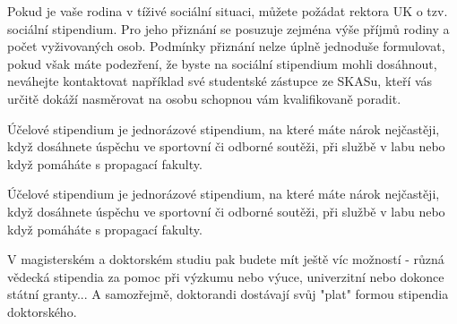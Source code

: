 Pokud je vaše rodina v tíživé sociální situaci, můžete požádat rektora UK o tzv.
sociální stipendium. Pro jeho přiznání se posuzuje zejména výše příjmů rodiny a
počet vyživovaných osob. Podmínky přiznání nelze úplně jednoduše formulovat,
pokud však máte podezření, že byste na sociální stipendium mohli dosáhnout,
neváhejte kontaktovat například své studentské zástupce ze SKASu, kteří vás
určitě dokáží nasměrovat na osobu schopnou vám kvalifikovaně poradit.

Účelové stipendium je jednorázové stipendium, na které máte nárok nejčastěji,
když dosáhnete úspěchu ve sportovní či odborné soutěži, při službě v labu nebo
když pomáháte s propagací fakulty.

Účelové stipendium je jednorázové stipendium, na které máte nárok nejčastěji,
když dosáhnete úspěchu ve sportovní či odborné soutěži, při službě v labu nebo
když pomáháte s propagací fakulty.

V magisterském a doktorském studiu pak budete mít ještě víc možností - různá
vědecká stipendia za pomoc při výzkumu nebo výuce, univerzitní nebo dokonce
státní granty... A samozřejmě, doktorandi dostávají svůj "plat" formou stipendia
doktorského.